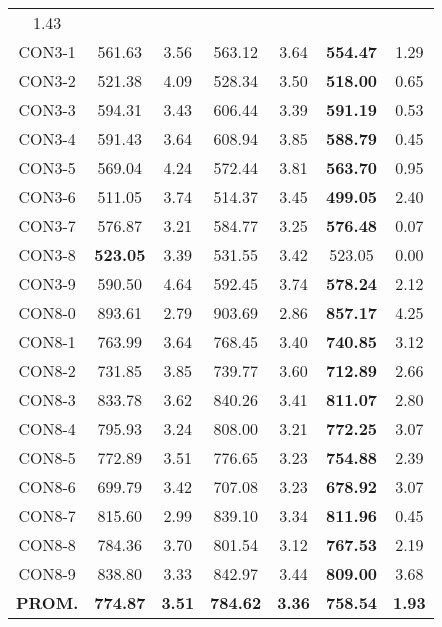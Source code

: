 \begin{table}[h]
\begin{tabular}{c c c c c c c}
1.43\\CON3-1 & 561.63 & 3.56 & 
563.12 & 3.64 & \bf{554.47} & 
1.29\\CON3-2 & 521.38 & 4.09 & 
528.34 & 3.50 & \bf{518.00} & 
0.65\\CON3-3 & 594.31 & 3.43 & 
606.44 & 3.39 & \bf{591.19} & 
0.53\\CON3-4 & 591.43 & 3.64 & 
608.94 & 3.85 & \bf{588.79} & 
0.45\\CON3-5 & 569.04 & 4.24 & 
572.44 & 3.81 & \bf{563.70} & 
0.95\\CON3-6 & 511.05 & 3.74 & 
514.37 & 3.45 & \bf{499.05} & 
2.40\\CON3-7 & 576.87 & 3.21 & 
584.77 & 3.25 & \bf{576.48} & 
0.07\\CON3-8 & \bf{523.05} & 3.39 & 
531.55 & 3.42 & 523.05 & 0.00\\
CON3-9 & 590.50 & 4.64 & 
592.45 & 3.74 & \bf{578.24} & 
2.12\\CON8-0 & 893.61 & 2.79 & 
903.69 & 2.86 & \bf{857.17} & 
4.25\\CON8-1 & 763.99 & 3.64 & 
768.45 & 3.40 & \bf{740.85} & 
3.12\\CON8-2 & 731.85 & 3.85 & 
739.77 & 3.60 & \bf{712.89} & 
2.66\\CON8-3 & 833.78 & 3.62 & 
840.26 & 3.41 & \bf{811.07} & 
2.80\\CON8-4 & 795.93 & 3.24 & 
808.00 & 3.21 & \bf{772.25} & 
3.07\\CON8-5 & 772.89 & 3.51 & 
776.65 & 3.23 & \bf{754.88} & 
2.39\\CON8-6 & 699.79 & 3.42 & 
707.08 & 3.23 & \bf{678.92} & 
3.07\\CON8-7 & 815.60 & 2.99 & 
839.10 & 3.34 & \bf{811.96} & 
0.45\\CON8-8 & 784.36 & 3.70 & 
801.54 & 3.12 & \bf{767.53} & 
2.19\\CON8-9 & 838.80 & 3.33 & 
842.97 & 3.44 & \bf{809.00} & 
3.68\\\bf{PROM.} & 
\bf{774.87} & \bf{3.51} & \bf{784.62} & \bf{3.36} & \bf{758.54} & \bf{1.93}\\[1ex]\hline
\end{tabular}
\label{table:ILS-VND-M-55-10}
\end{table}

